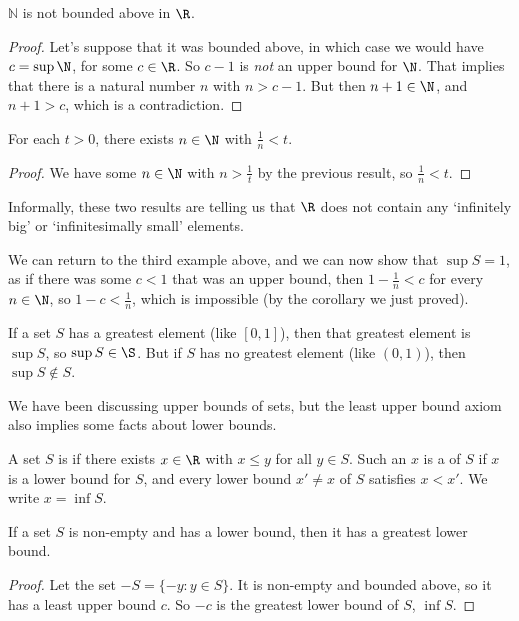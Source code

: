 \begin{theorem}
	$\mathbb{N}$ is not bounded above in $\R$.
\end{theorem}
\begin{proof}
	Let's suppose that it was bounded above, in which case we would have $c = \sup \N$, for some $c \in \R$. So $c - 1$ is \emph{not} an upper bound for $\N$. That implies that there is a natural number $n$ with $n > c - 1$. But then $n +1 \in \N$, and $n + 1 > c$, which is a contradiction.
\end{proof}

\begin{corollary}
	For each $t > 0$, there exists $n \in \N$ with $\frac{1}{n} < t$.
\end{corollary}
\begin{proof}
	We have some $n \in \N$ with $n > \frac{1}{t}$ by the previous result, so $\frac{1}{n} < t$.
\end{proof}

\begin{remark}
	Informally, these two results are telling us that $\R$ does not contain any `infinitely big' or `infinitesimally small' elements.
\end{remark}

We can return to the third example above, and we can now show that $\sup S = 1$, as if there was some $c < 1$ that was an upper bound, then $1 - \frac{1}{n} < c$ for every $n \in \N$, so $1 - c < \frac{1}{n}$, which is impossible (by the corollary we just proved).

\begin{remark}[Warning]
	If a set $S$ has a greatest element (like $[0, 1]$), then that greatest element is $\sup S$, so $\sup S \in \S$. But if $S$ has no greatest element (like $(0, 1)$), then $\sup S \not\in S$.
\end{remark}

We have been discussing upper bounds of sets, but the least upper bound axiom also implies some facts about lower bounds.

\begin{definition}
	A set $S$ is  if there exists $x \in \R$ with $x \leq y$ for all $y \in S$. Such an $x$ is a  of $S$ if $x$ is a lower bound for $S$, and every lower bound $x' \neq x$ of $S$ satisfies $x < x'$.
	We write $x = \inf S$.
\end{definition}

\begin{proposition}
If a set $S$ is non-empty and has a lower bound, then it has a greatest lower bound.	
\end{proposition}
\begin{proof}
	Let the set $-S = \{-y : y \in S\}$. It is non-empty and bounded above, so it has a least upper bound $c$. So $-c$ is the greatest lower bound of $S$, $\inf S$.
\end{proof}

